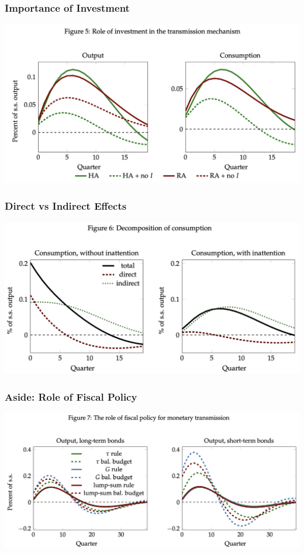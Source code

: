 \documentclass[english,xcolor=svgnames]{beamer}
\begin{document}
\begin{frame}
    \frametitle{Importance of Investment}
    \begin{center}
    	\includegraphics[scale=0.3]{figures/ARSFIG5.png}	
    \end{center}
\end{frame}

\begin{frame}
    \frametitle{Direct vs Indirect Effects}
    \begin{center}
    	\includegraphics[scale=0.3]{figures/ARSFIG6.png}	
    \end{center}
\end{frame}

\begin{frame}
    \frametitle{Aside: Role of Fiscal Policy}
    \begin{center}
    	\includegraphics[scale=0.25]{figures/ARSFIG7.png}	
    \end{center}
\end{frame}
\end{document}
